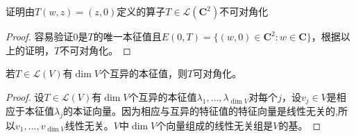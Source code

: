 \documentclass[10pt,a4paper,UTF8]{article}
\begin{document}
\begin{instance}
证明由\(T(w,z) = (z,0)\)定义的算子\(T\in \mathcal{L}(\mathbf{C}^{2})\)不可对角化
\end{instance}

\begin{proof}
容易验证\(0\)是\(T\)的唯一本征值且\(E(0,T) = \{(w,0)\in \mathbf{C}^{2}:w\in \mathbf{C}\}\)，根据以上的证明，\(T\)不可对角化。
\end{proof}

\begin{theorem}
若\(T\in \mathcal{L}(V)\)有\(\dim V\)个互异的本征值，则\(T\)可对角化。
\end{theorem}

\begin{proof}
设\(T\in \mathcal{L}(V)\)有\(\dim V\)个互异的本征值\(\lambda_{1},\ldots ,\lambda_{\dim V}\)对每个\(j\)，设\(v_{j}\in V\)是相应于本征值\(\lambda_{j}\)的本证向量。因为相应与互异的特征值的特征向量是线性无关的,所以\(v_{1},\ldots ,v_{\dim V}\)线性无关。\(V\)中\(\dim V\)个向量组成的线性无关组是\(V\)的基。
\end{proof}
\end{document}
